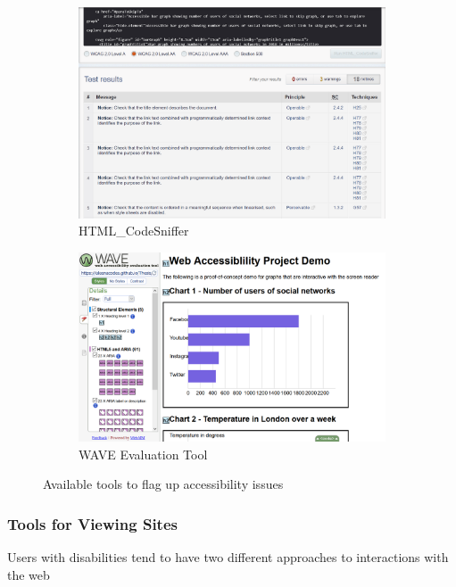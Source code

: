 \documentclass[ %
                    author={Aleena Baig},
                supervisor={Dr Simon Lock},
                    degree={BSc},
                     title={On Making Web Accessible Graphs},
                  subtitle={},
                      year={2019} ]{dissertation}
\begin{document}
\begin{figure}[h]
  \centering
  \begin{subfigure}[b]{0.4\linewidth}
    \includegraphics[width=0.9\linewidth]{images/HTMLCodeSniffer.PNG}
     \caption{HTML\_CodeSniffer}
  \end{subfigure}
  \begin{subfigure}[b]{0.4\linewidth}
    \includegraphics[width=\linewidth]{images/WAVETool.PNG}
    \caption{WAVE Evaluation Tool}
  \end{subfigure}
  \caption{Available tools to flag up accessibility issues}
  \label{fig:EvaluationTools}
\end{figure}

\subsubsection{Tools for Viewing Sites}

Users with disabilities tend to have two different approaches to interactions with the web
\end{document}
